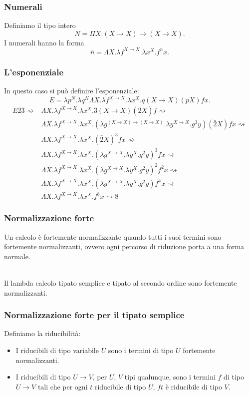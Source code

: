 \documentclass{beamer}
\renewcommand{\l}{\lambda}
\renewcommand{\L}{\Lambda}
\newcommand{\conv}{\rightsquigarrow}
\newcommand{\ar}{\rightarrow}
\begin{document}
\begin{frame}
    \frametitle{Numerali}
    Definiamo il tipo intero
    \[
        N = \Pi X. (X\ar X)\ar (X\ar X).
    \]
    I numerali hanno la forma
    \[
        \bar{n} = \L X. \l f^{X\ar X}. \l x^X. f^nx.
    \]
\end{frame}

\begin{frame}
    \frametitle{L'esponenziale}
    In questo caso si pu\`o definire l'esponenziale:
    \[
        E = \l p^N. \l q^N \L X. \l f^{X\ar X}. \l x^X. q(X\ar X) (pX) fx. 
    \]
    \begin{align*}
        E\bar{2}\bar{3} \conv &\L X. \l f^{X\ar X}. \l x^X. \bar{3}(X\ar X)
            (\bar{2}X) f \conv \\
        &\L X. \l f^{X\ar X}. \l x^X. (\l g^{(X\ar X)\ar (X\ar X)}. \l y^{X\ar X}
            . g^3 y) (\bar{2}X) fx \conv \\
        &\L X. \l f^{X\ar X}. \l x^X.  (\bar{2}X)^3 fx \conv \\
        &\L X. \l f^{X\ar X}.  \l x^X. (\l g^{X\ar X}.\l y^X. g^2 y)^3 fx \conv
            \\
        &\L X. \l f^{X\ar X}. \l x^X. (\l g^{X\ar X}.\l y^X. g^2 y)^2 f^2 x \conv
            \\
        &\L X. \l f^{X\ar X}. \l x^X. (\l g^{X\ar X}.\l y^X. g^2 y) f^4 x \conv
            \\
        &\L X. \l f^{X\ar X}. \l x^X. f^8 x \conv \bar{8}
    \end{align*}
\end{frame}

\begin{frame}
    \frametitle{Normalizzazione forte}
    Un calcolo \`e fortemente normalizzante quando tutti i suoi termini sono
    fortemente normalizzanti, ovvero ogni percorso di riduzione porta a una
    forma normale.
    \\~\

    Il lambda calcolo tipato semplice e tipato al secondo ordine sono fortemente
    normalizzanti.
\end{frame}

\begin{frame}
    \frametitle{Normalizzazione forte per il tipato semplice}
    Definiamo la riducibilit\`a:
    \begin{itemize}
    \item I riducibili di tipo variabile $U$ sono i termini di tipo $U$
        fortemente normalizzanti. 
    \item I riducibili di tipo $U\ar V$, per $U$, $V$ tipi qualunque, sono i
        termini $f$ di tipo $U\ar V$ tali che per ogni $t$ riducibile di tipo
            $U$, $ft$ \`e riducibile di tipo $V$.
    \end{itemize}
\end{frame}
\end{document}
